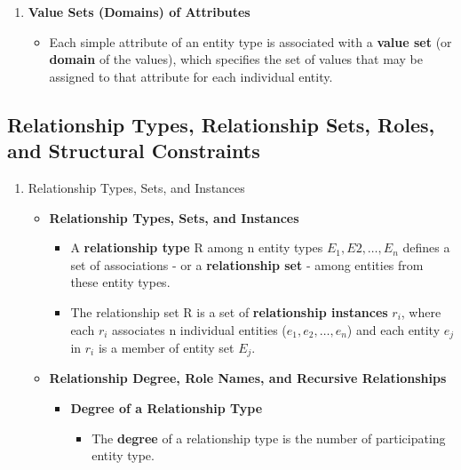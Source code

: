 \documentclass[10pt]{article}
\begin{document}
\begin{enumerate}
	\item \textbf{Value Sets (Domains) of Attributes}
	\begin{itemize}
		\item Each simple attribute of an entity type is associated with a \textbf{value set} (or \textbf{domain} of the values), which specifies the set of values that may be assigned to that attribute for each individual entity. 
	\end{itemize}	
\end{enumerate}

\subsection{Relationship Types, Relationship Sets, Roles, and Structural Constraints}
\begin{enumerate}
	\item Relationship Types, Sets, and Instances
	\begin{itemize}
		\item \textbf{Relationship Types, Sets, and Instances}
		\begin{itemize}
			\item A \textbf{relationship type} R among n entity types $E_{1}, E{2}, \ldots, E_{n}$ defines a set of associations - or a \textbf{relationship set} - among entities from these entity types.
			\item The relationship set R is a set of \textbf{relationship instances} $r_{i}$, where each $r_{i}$ associates n individual entities ($e_{1}, e_{2}, \ldots, e_{n}$) and each entity $e_{j}$ in $r_i$ is a member of entity set $E_{j}$.
		\end{itemize}

		\item \textbf{Relationship Degree, Role Names, and Recursive Relationships}
		\begin{itemize}
			\item \textbf{Degree of a Relationship Type}
			\begin{itemize}
				\item The \textbf{degree} of a relationship type is the number of participating entity type.
			\end{itemize}


\end{itemize}
\end{itemize}
\end{enumerate}
\end{document}
